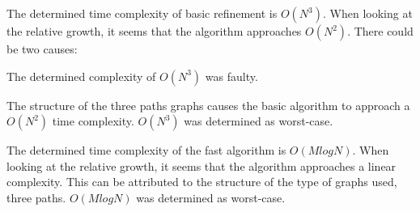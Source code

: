\documentclass[twoside]{article}
\begin{document}
\begin{multicols}{2}
The determined time complexity of basic refinement is $O(N^3)$. When looking at the relative growth, it seems that the algorithm approaches $O(N^2)$. There could be two causes:
\begin{compactitem}
	\item The determined complexity of $O(N^3)$ was faulty.
	\item The structure of the three paths graphs causes the basic algorithm to approach a $O(N^2)$ time complexity. $O(N^3)$ was determined as worst-case.
\end{compactitem}

The determined time complexity of the fast algorithm is $O(MlogN)$. When looking at the relative growth, it seems that the algorithm approaches a linear complexity. This can be attributed to the structure of the type of graphs used, three paths. $O(MlogN)$ was determined as worst-case.

\label{references}
\printbibliography


\end{multicols}
\end{document}
